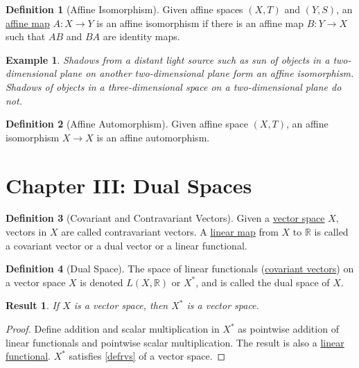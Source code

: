 \documentclass[letterpaper,12pt]{article}
\theoremstyle{plain}
\newtheorem{res}{Result}
\theoremstyle{plain}
\newtheorem{exmp}{Example}
\theoremstyle{definition}
\newtheorem{defn}{Definition}
\begin{document}
\begin{defn}[Affine Isomorphism]
Given affine spaces $(X,T)$ and $(Y,S)$, an \hyperref[defafmap]{affine map} $A:X \rightarrow Y$ is an affine isomorphism if there is an affine map $B:Y \rightarrow X$ such that $AB$ and $BA$ are identity maps.
\end{defn}

\begin{exmp}
Shadows from a distant light source such as sun of objects in a two-dimensional plane on another two-dimensional plane form an affine isomorphism. Shadows of objects in a three-dimensional space on a two-dimensional plane do not.
\end{exmp}

\begin{defn}[Affine Automorphism]
Given affine space $(X,T)$, an affine isomorphism $X \rightarrow X$ is an affine automorphism.
\end{defn}
\clearpage

\section{Chapter III: Dual Spaces}
\begin{defn}[Covariant and Contravariant Vectors]\label{defcoco}
Given a \hyperref[defrvs]{vector space} $X$, vectors in $X$ are called contravariant vectors. A \hyperref[deflinfvs]{linear map} from $X$ to $\mathbb{R}$ is called a covariant vector or a dual vector or a linear functional.
\end{defn}

\begin{defn}[Dual Space] The space of linear functionals (\hyperref[defcoco]{covariant vectors}) on a vector space $X$ is denoted $L(X,\mathbb{R})$ or $X^*$, and is called the dual space of $X$.
\end{defn}

\begin{res} If $X$ is a vector space, then $X^*$ is a vector space.
\end{res}
\begin{proof}
Define addition and scalar multiplication in $X^*$ as pointwise addition of linear functionals and pointwise scalar multiplication. The result is also a \hyperref[defcoco]{linear functional}. $X^*$ satisfies \autoref{defrvs} of a vector space.
\end{proof}
\end{document}
